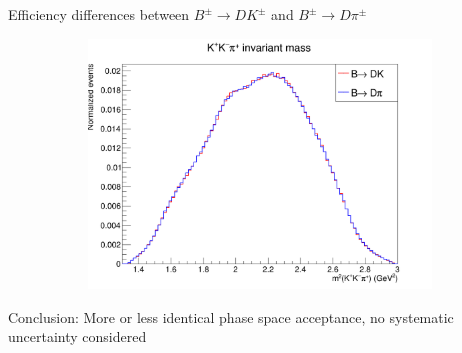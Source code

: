 \documentclass{beamer}
\begin{document}
\begin{frame}{Efficiency differences between $B^\pm\to DK^\pm$ and $B^\pm\to D\pi^\pm$}
\begin{figure}
\begin{subfigure}{0.33\textwidth}
      \includegraphics[width = 1.0\textwidth]{Plots/Dalitz_s012.png}
    \end{subfigure}
  \end{figure}
  \begin{center}
    Conclusion: More or less identical phase space acceptance, no systematic uncertainty considered
  \end{center}
\end{frame}  
\end{document}
